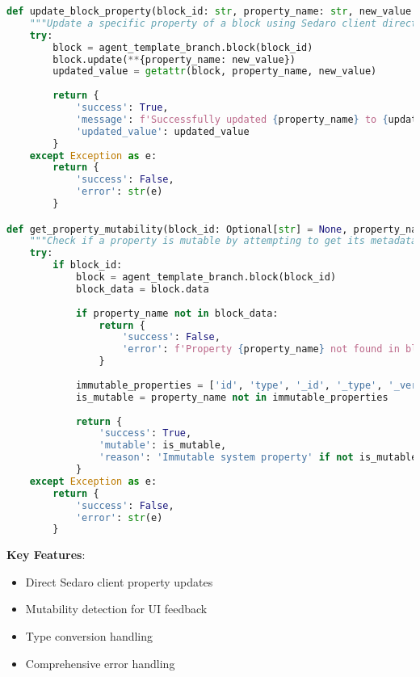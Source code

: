 \documentclass[12pt,a4paper]{article}
\begin{document}
\begin{lstlisting}[language=Python, caption=Property Update Functions]
def update_block_property(block_id: str, property_name: str, new_value: Any) -> Dict[str, Any]:
    """Update a specific property of a block using Sedaro client directly"""
    try:
        block = agent_template_branch.block(block_id)
        block.update(**{property_name: new_value})
        updated_value = getattr(block, property_name, new_value)
        
        return {
            'success': True,
            'message': f'Successfully updated {property_name} to {updated_value}',
            'updated_value': updated_value
        }
    except Exception as e:
        return {
            'success': False,
            'error': str(e)
        }

def get_property_mutability(block_id: Optional[str] = None, property_name: Optional[str] = None) -> Dict[str, Any]:
    """Check if a property is mutable by attempting to get its metadata"""
    try:
        if block_id:
            block = agent_template_branch.block(block_id)
            block_data = block.data
            
            if property_name not in block_data:
                return {
                    'success': False,
                    'error': f'Property {property_name} not found in block {block_id}'
                }
            
            immutable_properties = ['id', 'type', '_id', '_type', '_version', '_created', '_updated']
            is_mutable = property_name not in immutable_properties
            
            return {
                'success': True,
                'mutable': is_mutable,
                'reason': 'Immutable system property' if not is_mutable else 'Editable property'
            }
    except Exception as e:
        return {
            'success': False,
            'error': str(e)
        }
\end{lstlisting}

\textbf{Key Features}:
\begin{itemize}
    \item Direct Sedaro client property updates
    \item Mutability detection for UI feedback
    \item Type conversion handling
    \item Comprehensive error handling
\end{itemize}
\end{document}
